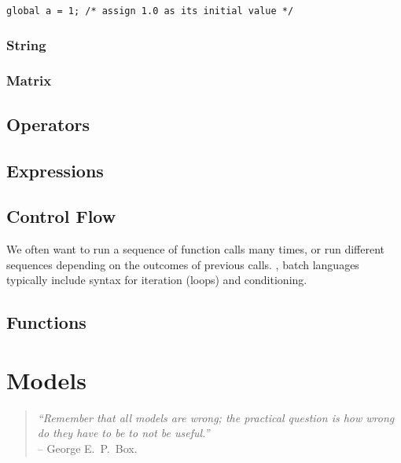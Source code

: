 \documentclass[12pt,twoside,openright]{book}
\begin{document}
\begin{leftbar}
\begin{verbatim}
global a = 1; /* assign 1.0 as its initial value */
\end{verbatim}
\end{leftbar}





\subsection {String}



\subsection {Matrix}



\section {Operators}

\section {Expressions}

\section {Control Flow}




We often want to run a sequence of function calls many times, or run different sequences depending on the outcomes of previous calls.  , batch languages typically include syntax for iteration (loops) and conditioning. 


\section {Functions}





\chapter {Models}

\begin{quote}
\textit{``Remember that all models are wrong; the practical question is how wrong do they have to be to not be useful.''}\\ -- George E.~P.~Box.
\end{quote}
\end{document}
